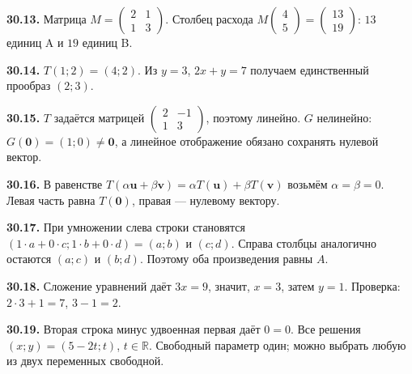 \documentclass[12pt,a4paper,oneside,openany]{book}
\theoremstyle{colordef}\newtheorem{definition}{Определение}[chapter]
\theoremstyle{plain}\newtheorem{theorem}{Теорема}[chapter]
\theoremstyle{definition}\newtheorem{axiom}{Аксиома}[chapter]
\begin{document}
\textbf{30.13.} Матрица \(M=\begin{pmatrix}2&1\\1&3\end{pmatrix}\). Столбец расхода \(M\begin{pmatrix}4\\5\end{pmatrix}=\begin{pmatrix}13\\19\end{pmatrix}\): \(13\) единиц A и \(19\) единиц B.\par
\textbf{30.14.} \(T(1;2)=(4;2)\). Из \(y=3\), \(2x+y=7\) получаем единственный прообраз \((2;3)\).\par
\textbf{30.15.} \(T\) задаётся матрицей \(\begin{pmatrix}2&-1\\1&3\end{pmatrix}\), поэтому линейно. \(G\) нелинейно: \(G(\symbf0)=(1;0)\ne\symbf0\), а линейное отображение обязано сохранять нулевой вектор.\par
\textbf{30.16.} В равенстве \(T(\alpha\symbf u+\beta\symbf v)=\alpha T(\symbf u)+\beta T(\symbf v)\) возьмём \(\alpha=\beta=0\). Левая часть равна \(T(\symbf0)\), правая — нулевому вектору.\par
\textbf{30.17.} При умножении слева строки становятся \((1\cdot a+0\cdot c;1\cdot b+0\cdot d)=(a;b)\) и \((c;d)\). Справа столбцы аналогично остаются \((a;c)\) и \((b;d)\). Поэтому оба произведения равны \(A\).\par
\textbf{30.18.} Сложение уравнений даёт \(3x=9\), значит, \(x=3\), затем \(y=1\). Проверка: \(2\cdot3+1=7\), \(3-1=2\).\par
\textbf{30.19.} Вторая строка минус удвоенная первая даёт \(0=0\). Все решения \((x;y)=(5-2t;t)\), \(t\in\mathbb R\). Свободный параметр один; можно выбрать любую из двух переменных свободной.\par
\end{document}
